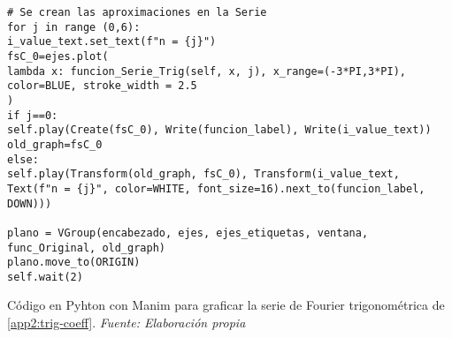 \begin{longlisting}
\begin{verbatim}
# Se crean las aproximaciones en la Serie
for j in range (0,6):
i_value_text.set_text(f"n = {j}")
fsC_0=ejes.plot(
lambda x: funcion_Serie_Trig(self, x, j), x_range=(-3*PI,3*PI), color=BLUE, stroke_width = 2.5
)
if j==0:
self.play(Create(fsC_0), Write(funcion_label), Write(i_value_text))
old_graph=fsC_0
else:
self.play(Transform(old_graph, fsC_0), Transform(i_value_text, Text(f"n = {j}", color=WHITE, font_size=16).next_to(funcion_label, DOWN)))

plano = VGroup(encabezado, ejes, ejes_etiquetas, ventana, func_Original, old_graph)
plano.move_to(ORIGIN)
self.wait(2)
	\end{verbatim}
	\caption[Código en Pyhton con Manim para graficar la serie de Fourier trigonométrica de \ref{app2:trig-coeff}.] {Código en Pyhton con Manim para graficar la serie de Fourier trigonométrica de \ref{app2:trig-coeff}. \textit{Fuente: Elaboración propia}} 
\end{longlisting}


